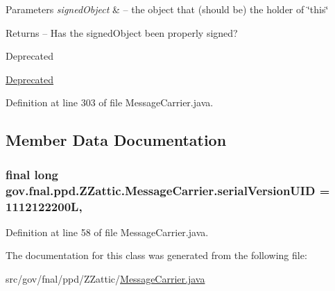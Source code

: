 \begin{DoxyParams}{Parameters}
{\em signed\-Object} & -- the object that (should be) the holder of \char`\"{}this\char`\"{} \\
\hline
\end{DoxyParams}
\begin{DoxyReturn}{Returns}
-- Has the signed\-Object been properly signed? 
\end{DoxyReturn}
\begin{DoxyRefDesc}{Deprecated}
\item[\hyperlink{deprecated__deprecated000018}{Deprecated}]\end{DoxyRefDesc}


Definition at line 303 of file Message\-Carrier.\-java.



\subsection{Member Data Documentation}
\hypertarget{classgov_1_1fnal_1_1ppd_1_1ZZattic_1_1MessageCarrier_ad53d90e55cdc6a470cf2ee8a715017e1}{
\subsubsection[{serial\-Version\-U\-I\-D}]{\setlength{\rightskip}{0pt plus 5cm}final long gov.\-fnal.\-ppd.\-Z\-Zattic.\-Message\-Carrier.\-serial\-Version\-U\-I\-D = 1112122200\-L\hspace{0.3cm}{\ttfamily [static]}, {\ttfamily [protected]}}}\label{classgov_1_1fnal_1_1ppd_1_1ZZattic_1_1MessageCarrier_ad53d90e55cdc6a470cf2ee8a715017e1}


Definition at line 58 of file Message\-Carrier.\-java.



The documentation for this class was generated from the following file\-:\begin{DoxyCompactItemize}
\item 
src/gov/fnal/ppd/\-Z\-Zattic/\hyperlink{MessageCarrier_8java}{Message\-Carrier.\-java}\end{DoxyCompactItemize}
